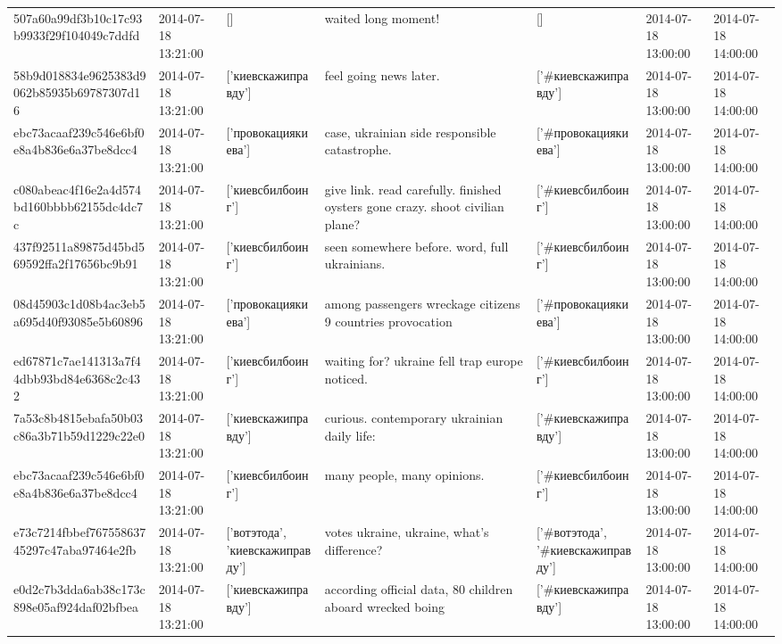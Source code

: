 \begin{tabular}{lllllll}
507a60a99df3b10c17c93b9933f29f104049c7ddfd & 2014-07-18 13:21:00 & [] & waited long moment! & [] & 2014-07-18 13:00:00 & 2014-07-18 14:00:00 \\
58b9d018834e9625383d9062b85935b69787307d16 & 2014-07-18 13:21:00 & ['киевскажиправду'] & feel going news later. & ['#киевскажиправду'] & 2014-07-18 13:00:00 & 2014-07-18 14:00:00 \\
ebc73acaaf239c546e6bf0e8a4b836e6a37be8dcc4 & 2014-07-18 13:21:00 & ['провокациякиева'] & case, ukrainian side responsible catastrophe. & ['#провокациякиева'] & 2014-07-18 13:00:00 & 2014-07-18 14:00:00 \\
c080abeac4f16e2a4d574bd160bbbb62155dc4dc7c & 2014-07-18 13:21:00 & ['киевсбилбоинг'] & give link. read carefully. finished oysters gone crazy. shoot civilian plane? & ['#киевсбилбоинг'] & 2014-07-18 13:00:00 & 2014-07-18 14:00:00 \\
437f92511a89875d45bd569592ffa2f17656bc9b91 & 2014-07-18 13:21:00 & ['киевсбилбоинг'] & seen somewhere before. word, full ukrainians. & ['#киевсбилбоинг'] & 2014-07-18 13:00:00 & 2014-07-18 14:00:00 \\
08d45903c1d08b4ac3eb5a695d40f93085e5b60896 & 2014-07-18 13:21:00 & ['провокациякиева'] & among passengers wreckage citizens 9 countries provocation & ['#провокациякиева'] & 2014-07-18 13:00:00 & 2014-07-18 14:00:00 \\
ed67871c7ae141313a7f44dbb93bd84e6368c2c432 & 2014-07-18 13:21:00 & ['киевсбилбоинг'] & waiting for? ukraine fell trap europe noticed. & ['#киевсбилбоинг'] & 2014-07-18 13:00:00 & 2014-07-18 14:00:00 \\
7a53c8b4815ebafa50b03c86a3b71b59d1229c22e0 & 2014-07-18 13:21:00 & ['киевскажиправду'] & curious. contemporary ukrainian daily life: & ['#киевскажиправду'] & 2014-07-18 13:00:00 & 2014-07-18 14:00:00 \\
ebc73acaaf239c546e6bf0e8a4b836e6a37be8dcc4 & 2014-07-18 13:21:00 & ['киевсбилбоинг'] & many people, many opinions. & ['#киевсбилбоинг'] & 2014-07-18 13:00:00 & 2014-07-18 14:00:00 \\
e73c7214fbbef76755863745297c47aba97464e2fb & 2014-07-18 13:21:00 & ['вотэтода', 'киевскажиправду'] & votes ukraine, ukraine, what's difference? & ['#вотэтода', '#киевскажиправду'] & 2014-07-18 13:00:00 & 2014-07-18 14:00:00 \\
e0d2c7b3dda6ab38c173c898e05af924daf02bfbea & 2014-07-18 13:21:00 & ['киевскажиправду'] & according official data, 80 children aboard wrecked boing & ['#киевскажиправду'] & 2014-07-18 13:00:00 & 2014-07-18 14:00:00 \\

\end{tabular}
